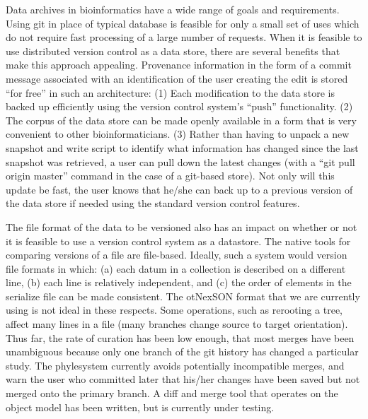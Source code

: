 \documentclass{bioinfo}
\newcommand{\ps}{phylesystem\xspace}
\newcommand{\nexson}{otNexSON\xspace}
\begin{document}
Data archives in bioinformatics have a wide range of goals and requirements.
Using git in place of typical database is feasible for only a small set of uses which do not require
    fast processing of a large number of requests.
When it is feasible to use distributed version control as a data store, there are several benefits
    that make this approach appealing.
Provenance information in the form of a commit message associated with an identification of the 
    user creating the edit is stored ``for free'' in such an architecture:
(1) Each modification to the data store is backed up efficiently using the version control system's ``push'' functionality.
(2) The corpus of the data store can be made openly available in a form that is very convenient to
    other bioinformaticians.
(3) Rather than having to unpack a new snapshot and write script to identify
    what information has changed since the last snapshot was retrieved, a user can pull down
    the latest changes (with a ``git pull origin master'' command in the case of a git-based store).
Not only will this update be fast, the user knows that he/she can back up to a previous version of the 
    data store if needed using the standard version control features.

The file format of the data to be versioned also has an impact on whether or not it is feasible
    to use a version control system as a datastore.
The native tools for comparing versions of a file are file-based.
Ideally, such a system would version file formats in which:
    (a) each datum in a collection is described on a different line, 
    (b) each line is relatively independent, and 
    (c) the order of elements in the serialize file can be made consistent.
The \nexson format that we are currently using is not ideal in these respects.
Some operations, such as rerooting a tree,
    affect many lines in a file (many branches change source to target orientation).
Thus far, the rate of curation has been low enough, that most merges have been unambiguous because
    only one branch of the git history has changed a particular study.
The \ps currently avoids potentially incompatible merges, and warn the user who committed later that his/her
    changes have been saved but not merged onto the primary branch.
A diff and merge tool that operates on the object model has been written, but is currently under testing.
\end{document}
